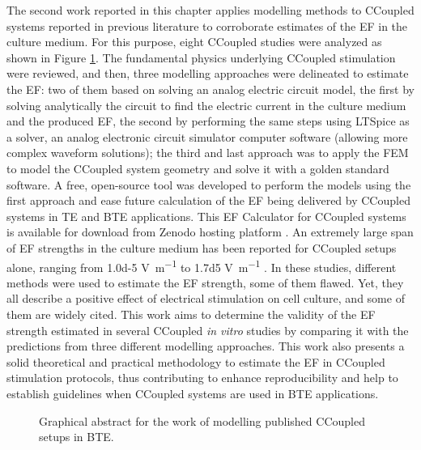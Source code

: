 The second work reported in this chapter applies modelling methods to \acs{CCoupled} systems reported in previous literature to corroborate estimates of the \acs{EF} in the culture medium. For this purpose, eight \acs{CCoupled} studies were analyzed as shown in Figure \ref{fig5d1}. The fundamental physics underlying \acs{CCoupled} stimulation were reviewed, and then, three modelling approaches were delineated to estimate the \acs{EF}: two of them based on solving an analog electric circuit model, the first by solving analytically the circuit to find the electric current in the culture medium and the produced \acs{EF}, the second by performing the same steps using LTSpice as a solver, an analog electronic circuit simulator computer software (allowing more complex waveform solutions); the third and last approach was to apply the \acs{FEM} to model the \acs{CCoupled} system geometry and solve it with a golden standard software. A free, open-source tool was developed to perform the models using the first approach and ease future calculation of the \acs{EF} being delivered by \acs{CCoupled} systems in \acs{TE} and \acs{BTE} applications. This \acs{EF} Calculator for \acs{CCoupled} systems is available for download from Zenodo hosting platform \cite{Meneses2022-yk}. An extremely large span of \acs{EF} strengths in the culture medium has been reported for \acs{CCoupled} setups alone, ranging from \num{1.0d-5} \si{\volt\per\meter} \cite{Fitzsimmons1986-ks} to \num{1.7d5} \si{\volt\per\meter} \cite{Rodan1978-yu}. In these studies, different methods were used to estimate the \acs{EF} strength, some of them flawed. Yet, they all describe a positive effect of electrical stimulation on cell culture, and some of them are widely cited. This work aims to determine the validity of the \acs{EF} strength estimated in several \acs{CCoupled} \textit{in vitro} studies by comparing it with the predictions from three different modelling approaches. This work also presents a solid theoretical and practical methodology to estimate the \acs{EF} in \acs{CCoupled} stimulation protocols, thus contributing to enhance reproducibility and help to establish guidelines when \acs{CCoupled} systems are used in \acs{BTE} applications.

\begin{figure}[h]
\caption{Graphical abstract for the work of modelling published CCoupled setups in \acs{BTE}.}
\label{fig5d1}
\end{figure}




